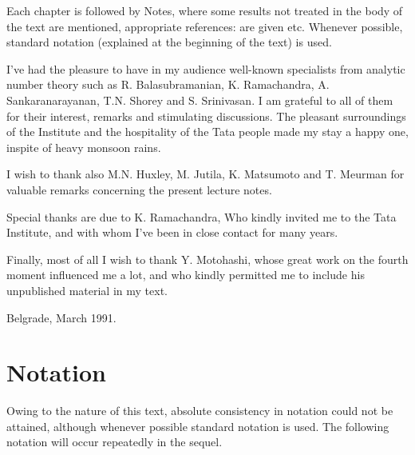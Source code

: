 Each chapter is followed by Notes, where some results not treated in
the body of the text are mentioned, appropriate references: are given
etc. Whenever possible, standard notation (explained at the beginning
of the text) is used. 

I've had the pleasure to have in my audience well-known specialists
from analytic number theory such as R. Balasubramanian,
K. Ramachandra, A. Sankaranarayanan, T.N. Shorey and S. Srinivasan. I
am grateful to all of them for their interest, remarks and stimulating
discussions. The pleasant surroundings of the Institute and the
hospitality of the Tata people made my stay a happy one, inspite of
heavy monsoon rains.

I wish to thank also M.N. Huxley, M. Jutila, K. Matsumoto and
T. Meurman for valuable remarks concerning the present lecture notes.

Special thanks are due to K. Ramachandra, Who kindly invited me to the
Tata Institute, and with whom I've been in close contact for many
years.

Finally, most of all I wish to thank Y. Motohashi, whose great work on
the fourth moment influenced me a lot, and who kindly permitted me to
include his unpublished material in my text.

Belgrade, March 1991.

\chapter{Notation}

Owing to the nature of this text, absolute consistency in notation
could not be attained, although whenever possible standard notation is
used. The following notation will occur repeatedly in the sequel.

